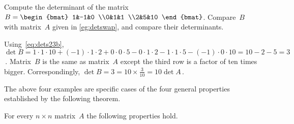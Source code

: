 \begin{example} 
Compute the determinant of the matrix
\(B=\begin{bmat} 1&-1&0
\\0&1&1
\\2&5&10 \end{bmat}\).
Compare~\(B\) with matrix~\(A\) given in \cref{eg:detswap}, and compare their determinants.
\begin{solution} 
Using~\eqref{eq:dets23b}, \(\det B 
=1\cdot1\cdot10 +(-1)\cdot1\cdot2 +0\cdot0\cdot5
-0\cdot1\cdot2 -1\cdot1\cdot5 -(-1)\cdot0\cdot10 
=10-2-5=3\)\,.  
Matrix~\(B\) is the same as matrix~\(A\) except the third row is a factor of ten times bigger.
Correspondingly, \(\det B=3=10\times\frac3{10}=10\det A\)\,.
\end{solution}
\end{example}






The above four examples are specific cases of the four general properties established by the following theorem. 


\begin{theorem} \label{thm:ppdet} 
For every \(n\times n\) matrix~\(A\) the following properties hold.
\end{theorem}

